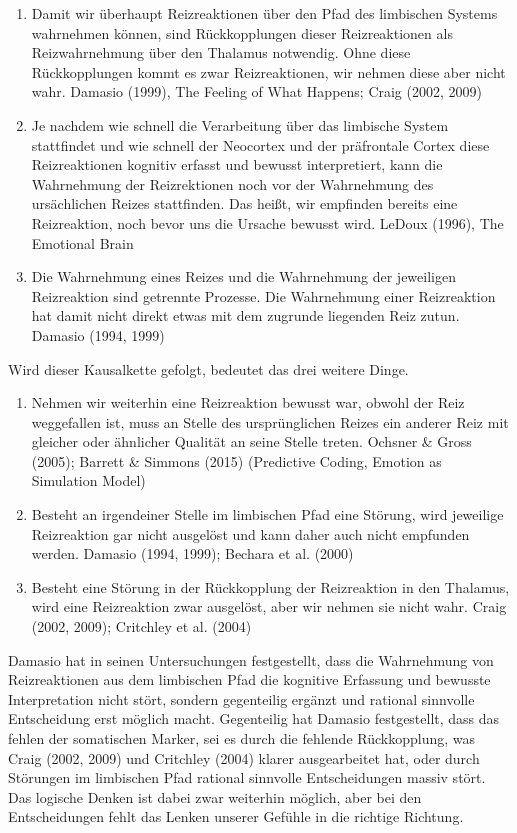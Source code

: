 \begin{enumerate}
  \item Damit wir überhaupt Reizreaktionen über den Pfad des limbischen Systems wahrnehmen können, sind Rückkopplungen dieser Reizreaktionen als Reizwahrnehmung über den Thalamus notwendig. Ohne diese Rückkopplungen kommt es zwar Reizreaktionen, wir nehmen diese aber nicht wahr. Damasio (1999), The Feeling of What Happens; Craig (2002, 2009)
  \item Je nachdem wie schnell die Verarbeitung über das limbische System stattfindet und wie schnell der Neocortex und der präfrontale Cortex diese Reizreaktionen kognitiv erfasst und bewusst interpretiert, kann die Wahrnehmung der Reizrektionen noch vor der Wahrnehmung des ursächlichen Reizes stattfinden. Das heißt, wir empfinden bereits eine Reizreaktion, noch bevor uns die Ursache bewusst wird. LeDoux (1996), The Emotional Brain
  \item Die Wahrnehmung eines Reizes und die Wahrnehmung der jeweiligen Reizreaktion sind getrennte Prozesse. Die Wahrnehmung einer Reizreaktion hat damit nicht direkt etwas mit dem zugrunde liegenden Reiz zutun. Damasio (1994, 1999)
\end{enumerate}

Wird dieser Kausalkette gefolgt, bedeutet das drei weitere Dinge.

\begin{enumerate}
  \item Nehmen wir weiterhin eine Reizreaktion bewusst war, obwohl der Reiz weggefallen ist, muss an Stelle des ursprünglichen Reizes ein anderer Reiz mit gleicher oder ähnlicher Qualität an seine Stelle treten. Ochsner \& Gross (2005); Barrett \& Simmons (2015) (Predictive Coding, Emotion as Simulation Model)
  \item Besteht an irgendeiner Stelle im limbischen Pfad eine Störung, wird jeweilige Reizreaktion gar nicht ausgelöst und kann daher auch nicht empfunden werden. Damasio (1994, 1999); Bechara et al. (2000)
  \item Besteht eine Störung in der Rückkopplung der Reizreaktion in den Thalamus, wird eine Reizreaktion zwar ausgelöst, aber wir nehmen sie nicht wahr. Craig (2002, 2009); Critchley et al. (2004)
\end{enumerate}

Damasio hat in seinen Untersuchungen festgestellt, dass die Wahrnehmung von Reizreaktionen aus dem limbischen Pfad die kognitive Erfassung und bewusste Interpretation nicht stört, sondern gegenteilig ergänzt und rational sinnvolle Entscheidung erst möglich macht. Gegenteilig hat Damasio festgestellt, dass das fehlen der somatischen Marker, sei es durch die fehlende Rückkopplung, was Craig (2002, 2009) und Critchley (2004) klarer ausgearbeitet hat, oder durch Störungen im limbischen Pfad rational sinnvolle Entscheidungen massiv stört. Das logische Denken ist dabei zwar weiterhin möglich, aber bei den Entscheidungen fehlt das Lenken unserer Gefühle in die richtige Richtung.

